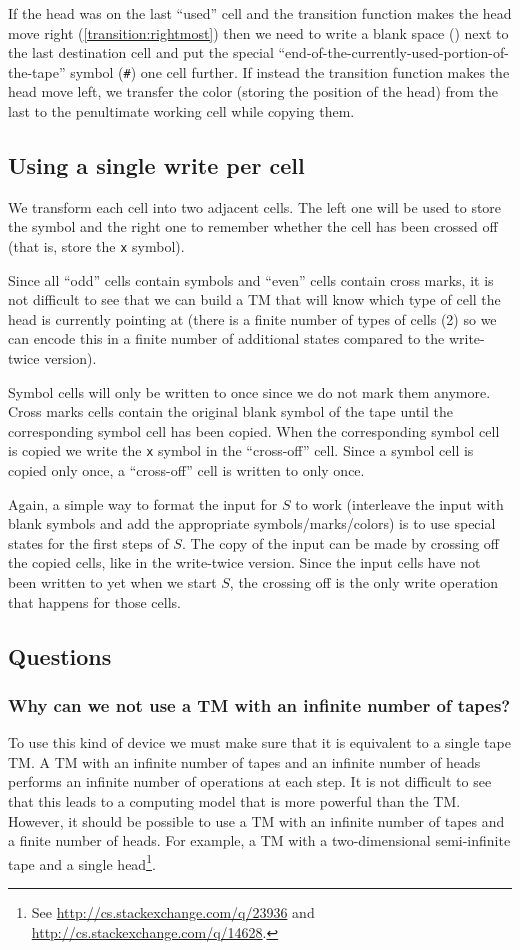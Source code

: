 \documentclass{article}
\newcommand{\0}{\texttt{\textvisiblespace}}
\newcommand{\°}{\obullet{\0}}
\newcommand{\X}{\texttt{x}}
\newcommand{\e}{\texttt{\#}}
\newcommand{\TM}{TM}
\begin{document}
If the head was on the last ``used'' cell and the transition function makes
the head move right (\ref{transition:rightmost}) then we need to write a blank space (\°{}) next to the
last destination
cell and put the special
``end-of-the-currently-used-portion-of-the-tape'' symbol (\e)
one cell further. If instead the transition function makes the head move left,
we transfer the color (storing the position of the head) from the last
to the penultimate working cell while copying them.

\subsection{Using a single write per cell}

We transform each cell into two adjacent cells. The left one will be used to
store the symbol and the right one to remember whether the cell has been
crossed off (that is, store the \X{} symbol).

Since all ``odd'' cells contain symbols and ``even'' cells contain cross marks,
it is not difficult to see that we can build a \TM{} that will know
which type of cell the head is currently pointing at (there is a finite number
of types of cells (2) so we can encode this in a finite number of additional
states compared to the write-twice version).

Symbol cells will only be written to once since we do not mark them anymore.
Cross marks cells contain the original blank symbol of the tape until the
corresponding symbol cell has been copied. When the corresponding symbol cell
is copied we write the \X{} symbol in the ``cross-off'' cell. Since a symbol
cell is copied only once, a ``cross-off'' cell is written to only once.

Again, a simple way to format the input for \(S\) to work
(interleave the input with blank symbols and add the
appropriate symbols/marks/colors) is to use special states for the
first steps of \(S\). The copy of the input can be made by crossing off the copied
cells, like in the write-twice version. Since the input cells have not been
written to yet when we start \(S\), the crossing off is the only write
operation that happens for those cells.


\subsection{Questions}
\subsubsection{Why can we not use a \TM{} with an infinite number of
tapes?}
To use this kind of device we must make sure that it is equivalent to a single
tape \TM{}.
A \TM{} with an infinite number of tapes and an infinite number of heads
performs an infinite number
of operations at each step.
It is not difficult to see that this leads to a
computing model that is more powerful than the \TM{}.
However, it should be possible to use a \TM{} with an infinite number of tapes
and a finite number of heads. For example, a \TM{} with a two-dimensional
semi-infinite tape and a single head\footnote{See
\url{http://cs.stackexchange.com/q/23936}
and
\url{http://cs.stackexchange.com/q/14628}.}.
\end{document}
